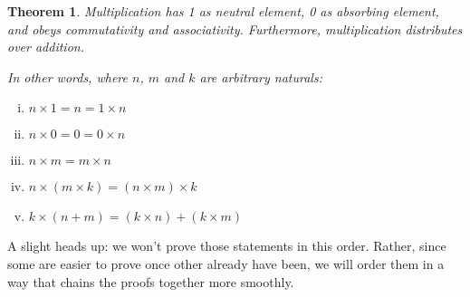 \documentclass[12pt,a4paper]{article}
\theoremstyle{definition}
\theoremstyle{definition}
\theoremstyle{plain}
\newtheorem{theorem}{Theorem}
\theoremstyle{plain}
\begin{document}
	\begin{theorem}
		Multiplication has 1 as neutral element, 0 as absorbing element, and obeys commutativity and associativity. Furthermore, multiplication distributes over addition.
		
		In other words, where $n$, $m$ and $k$ are arbitrary naturals:
		
		\begin{enumerate}[i.]
			\item\label{one} $n \times 1 = n = 1 \times n$
			\item\label{zero} $n \times 0 = 0 = 0 \times n$
			\item\label{comm} $n \times m = m \times n$
			\item\label{assoc} $n \times (m \times k) = (n \times m) \times k$
			\item\label{dist} $k \times (n + m) = (k \times n) + (k \times m)$
		\end{enumerate}
	\end{theorem}
	
	A slight heads up: we won't prove those statements in this order. Rather, since some are easier to prove once other already have been, we will order them in a way that chains the proofs together more smoothly.
	
\end{document}
